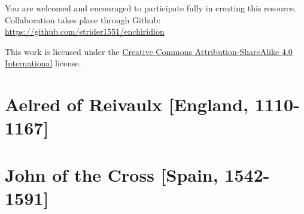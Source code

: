

\frontmatter
\thispagestyle{empty}
\vspace*{\fill}
\clearpage

\thispagestyle{empty}
\vspace*{\fill}
{\noindent You are welcomed and encouraged to participate fully in creating this resource. Collaboration takes place through Github: \href{https://github.com/strider1551/enchiridion}{https://github.com/strider1551/enchiridion}}
\vspace*{2in}
\begin{center}
	This work is licensed under the \href{https://creativecommons.org/licenses/by-sa/4.0/}{Creative Commons Attribution-ShareAlike 4.0 International} license.\bigskip
\end{center}
\vspace*{1in}

\mainmatter
\chapter*{Aelred of Reivaulx [England, 1110-1167]}
    

\chapter*{John of the Cross [Spain, 1542-1591]}
	

